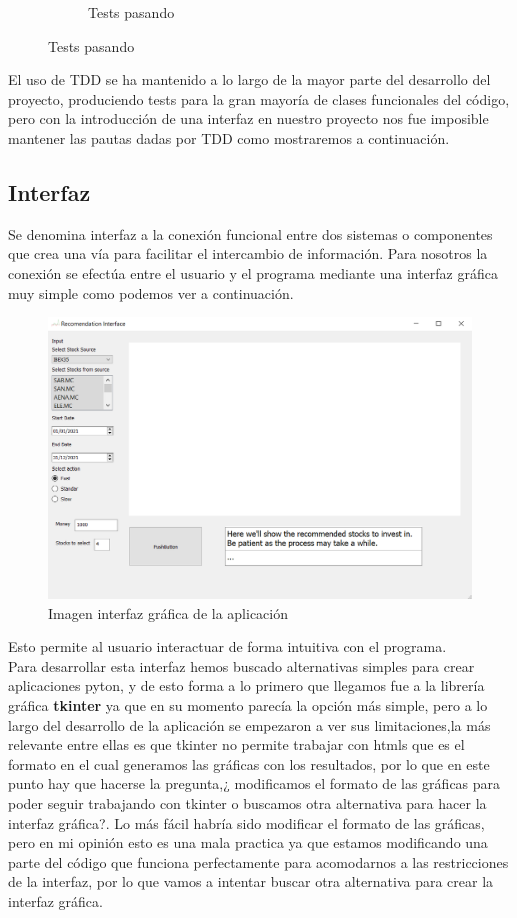 \documentclass[12pt,a4paper]{article}
\begin{document}
\begin{figure}[H]
\begin{subfigure}{.5\textwidth}
  \caption{Tests pasando}
  \label{fig:sub2}
\end{subfigure}
\label{fig:test}
\end{figure}
	 El uso de TDD se ha mantenido a lo largo de la mayor parte del desarrollo del proyecto, produciendo tests para la gran mayoría de clases funcionales del código, pero con la introducción de una interfaz en nuestro proyecto nos fue imposible mantener las pautas dadas por TDD como mostraremos a continuación.\\
	 
	\subsection{Interfaz}
	Se denomina interfaz a la conexión funcional entre dos sistemas o componentes que crea una vía para facilitar el intercambio de información. Para nosotros la conexión se efectúa entre el usuario y el programa mediante una interfaz gráfica muy simple como podemos ver a continuación.\\
	\begin{figure}[H]
\centering
  \centering
  \includegraphics[width=1\linewidth]{interface}
\caption{Imagen interfaz gráfica de la aplicación}
\label{fig:subrgrafo}
\end{figure}
	 Esto permite al usuario interactuar de forma intuitiva con el programa.\\
	 Para desarrollar esta interfaz hemos buscado alternativas simples para crear aplicaciones pyton, y de esto forma a lo primero que llegamos fue a la librería gráfica \textbf{tkinter} ya que en su momento parecía la opción más simple, pero a lo largo del desarrollo de la aplicación se empezaron a ver sus limitaciones,la más relevante entre ellas es que tkinter no permite trabajar con htmls que es el formato en el cual generamos las gráficas con los resultados, por lo que en este punto hay que hacerse la pregunta,¿ modificamos el formato de las gráficas para poder seguir trabajando con tkinter o buscamos otra alternativa para hacer la interfaz gráfica?. Lo más fácil habría sido modificar el formato de las gráficas, pero en mi opinión esto es una mala practica ya que estamos modificando una parte del código que funciona perfectamente para acomodarnos a las restricciones de la interfaz, por lo que vamos a intentar buscar otra alternativa para crear la interfaz gráfica.\\
\end{document}
